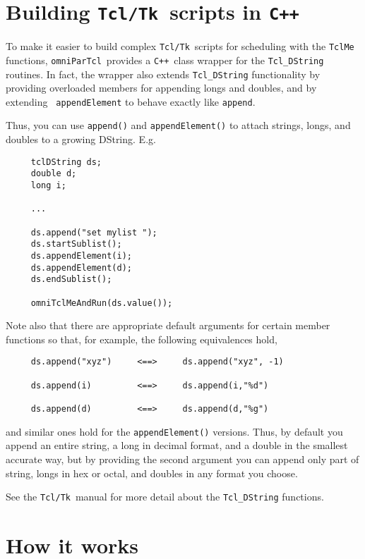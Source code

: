 \documentclass[11pt]{article}
\def\omniParTcl{{\tt omniParTcl}}
\def\tcltk{{\tt Tcl/Tk}}
\def\CXX{{\tt C++}}
\begin{document}
\section{Building \tcltk\ scripts in \CXX}

To make it easier to build complex \tcltk\ scripts for scheduling
with the {\tt TclMe} functions, \omniParTcl\ provides a \CXX\ class
wrapper for the {\tt Tcl\_DString} routines.  In fact, the wrapper also
extends {\tt Tcl\_DString} functionality by providing overloaded
members for appending longs and doubles, and by extending {\tt
appendElement} to behave exactly like {\tt append}.

Thus, 
you can use {\tt append()} and {\tt appendElement()} to
attach strings, longs, and doubles to a growing DString.  E.g.

\begin{verbatim}
     tclDString ds;
     double d;
     long i;

     ...

     ds.append("set mylist ");
     ds.startSublist();
     ds.appendElement(i);
     ds.appendElement(d);
     ds.endSublist();

     omniTclMeAndRun(ds.value());
\end{verbatim}

Note also that there are appropriate default arguments for certain
member functions so that, for example, the following equivalences
hold,

\begin{verbatim}
     ds.append("xyz")     <==>     ds.append("xyz", -1)

     ds.append(i)         <==>     ds.append(i,"%d")  

     ds.append(d)         <==>     ds.append(d,"%g")
\end{verbatim}

\noindent
and similar ones hold for the {\tt appendElement()} versions.  Thus, by
default you append an entire string, a long in decimal format, and a
double in the smallest accurate way, but by providing the second
argument you can append only part of string, longs in hex or octal, and
doubles in any format you choose.

See the \tcltk\ manual for more detail about the {\tt Tcl\_DString} functions.

\section{How it works}
\end{document}
